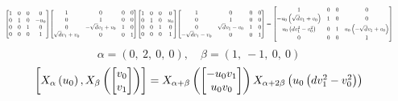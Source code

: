 \documentclass[11pt]{article}
\theoremstyle{definition}
\begin{document}
\[
\scaletoalign{\textwidth}{{\left[\begin{matrix}1 & 0 & 0 & 0\\0 & 1 & 0 & - u_{0}\\0 & 0 & 1 & 0\\0 & 0 & 0 & 1\end{matrix}\right]} {\left[\begin{matrix}1 & 0 & 0 & 0\\0 & 1 & 0 & 0\\0 & - \sqrt{d} v_{1} + v_{0} & 1 & 0\\\sqrt{d} v_{1} + v_{0} & 0 & 0 & 1\end{matrix}\right]} {\left[\begin{matrix}1 & 0 & 0 & 0\\0 & 1 & 0 & u_{0}\\0 & 0 & 1 & 0\\0 & 0 & 0 & 1\end{matrix}\right]} {\left[\begin{matrix}1 & 0 & 0 & 0\\0 & 1 & 0 & 0\\0 & \sqrt{d} v_{1} - v_{0} & 1 & 0\\- \sqrt{d} v_{1} - v_{0} & 0 & 0 & 1\end{matrix}\right]} = {\left[\begin{matrix}1 & 0 & 0 & 0\\- u_{0} \left(\sqrt{d} v_{1} + v_{0}\right) & 1 & 0 & 0\\u_{0} \left(d v_{1}^{2} - v_{0}^{2}\right) & 0 & 1 & u_{0} \left(- \sqrt{d} v_{1} + v_{0}\right)\\0 & 0 & 0 & 1\end{matrix}\right]}}
\]
\[
\alpha = \left( 0, \  2, \  0, \  0\right), \quad \beta = \left( 1, \  -1, \  0, \  0\right)
\]
\[
\scaletoalign{\textwidth}{\left[ X_{\alpha}\left(u_{0}\right), X_{\beta}\left(\left[\begin{matrix}v_{0}\\v_{1}\end{matrix}\right]\right) \right] = X_{\alpha + \beta}\left(\left[\begin{matrix}- u_{0} v_{1}\\u_{0} v_{0}\end{matrix}\right]\right) X_{\alpha + 2\beta}\left(u_{0} \left(d v_{1}^{2} - v_{0}^{2}\right)\right)}
\]
\end{document}
